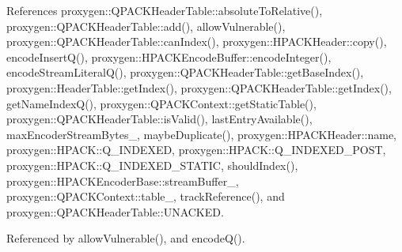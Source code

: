 References proxygen\+::\+Q\+P\+A\+C\+K\+Header\+Table\+::absolute\+To\+Relative(), proxygen\+::\+Q\+P\+A\+C\+K\+Header\+Table\+::add(), allow\+Vulnerable(), proxygen\+::\+Q\+P\+A\+C\+K\+Header\+Table\+::can\+Index(), proxygen\+::\+H\+P\+A\+C\+K\+Header\+::copy(), encode\+Insert\+Q(), proxygen\+::\+H\+P\+A\+C\+K\+Encode\+Buffer\+::encode\+Integer(), encode\+Stream\+Literal\+Q(), proxygen\+::\+Q\+P\+A\+C\+K\+Header\+Table\+::get\+Base\+Index(), proxygen\+::\+Header\+Table\+::get\+Index(), proxygen\+::\+Q\+P\+A\+C\+K\+Header\+Table\+::get\+Index(), get\+Name\+Index\+Q(), proxygen\+::\+Q\+P\+A\+C\+K\+Context\+::get\+Static\+Table(), proxygen\+::\+Q\+P\+A\+C\+K\+Header\+Table\+::is\+Valid(), last\+Entry\+Available(), max\+Encoder\+Stream\+Bytes\+\_\+, maybe\+Duplicate(), proxygen\+::\+H\+P\+A\+C\+K\+Header\+::name, proxygen\+::\+H\+P\+A\+C\+K\+::\+Q\+\_\+\+I\+N\+D\+E\+X\+ED, proxygen\+::\+H\+P\+A\+C\+K\+::\+Q\+\_\+\+I\+N\+D\+E\+X\+E\+D\+\_\+\+P\+O\+ST, proxygen\+::\+H\+P\+A\+C\+K\+::\+Q\+\_\+\+I\+N\+D\+E\+X\+E\+D\+\_\+\+S\+T\+A\+T\+IC, should\+Index(), proxygen\+::\+H\+P\+A\+C\+K\+Encoder\+Base\+::stream\+Buffer\+\_\+, proxygen\+::\+Q\+P\+A\+C\+K\+Context\+::table\+\_\+, track\+Reference(), and proxygen\+::\+Q\+P\+A\+C\+K\+Header\+Table\+::\+U\+N\+A\+C\+K\+ED.



Referenced by allow\+Vulnerable(), and encode\+Q().


